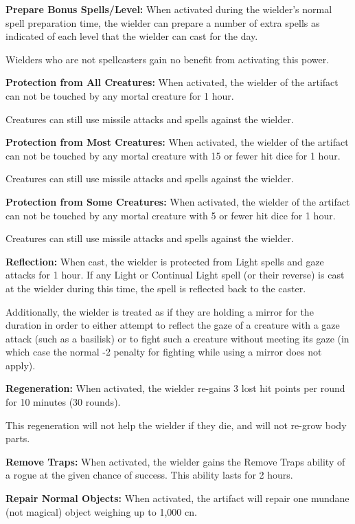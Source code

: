 \begin{multicols*}{2}
\textbf{Prepare Bonus Spells/Level:} When activated during the wielder’s normal spell preparation time, the wielder can prepare a number of extra spells as indicated of each level that the wielder can cast for the day.

Wielders who are not spellcasters gain no benefit from activating this power.

\textbf{Protection from All Creatures:} When activated, the wielder of the artifact can not be touched by any mortal creature for 1 hour.

Creatures can still use missile attacks and spells against the wielder.

\textbf{Protection from Most Creatures:} When activated, the wielder of the artifact can not be touched by any mortal creature with 15 or fewer hit dice for 1 hour.

Creatures can still use missile attacks and spells against the wielder.

\textbf{Protection from Some Creatures:} When activated, the wielder of the artifact can not be touched by any mortal creature with 5 or fewer hit dice for 1 hour.

Creatures can still use missile attacks and spells against the wielder.

\textbf{Reflection:} When cast, the wielder is protected from Light spells and gaze attacks for 1 hour. If any Light or Continual Light spell (or their reverse) is cast at the wielder during this time, the spell is reflected back to the caster.

Additionally, the wielder is treated as if they are holding a mirror for the duration in order to either attempt to reflect the gaze of a creature with a gaze attack (such as a basilisk) or to fight such a creature without meeting its gaze (in which case the normal -2 penalty for fighting while using a mirror does not apply).

\textbf{Regeneration:} When activated, the wielder re-gains 3 lost hit points per round for 10 minutes (30 rounds).

This regeneration will not help the wielder if they die, and will not re-grow body parts.

\textbf{Remove Traps:} When activated, the wielder gains the Remove Traps ability of a rogue at the given chance of success. This ability lasts for 2 hours.

\textbf{Repair Normal Objects:} When activated, the artifact will repair one mundane (not magical) object weighing up to 1,000 cn.


\end{multicols*}
